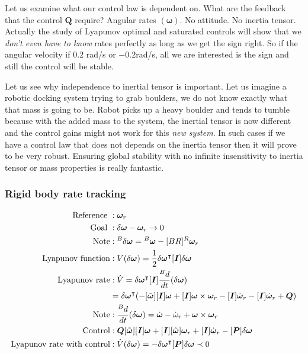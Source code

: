 \documentclass{article}
\begin{document}
Let us examine what our control law is dependent on. What are the feedback that the control $\bm{Q}$ require? Angular rates $(\bm{\omega})$. No attitude. No inertia tensor. Actually the study of Lyapunov optimal and saturated controls will show that we \textit{don't even have to know} rates perfectly as long as we get the sign right. So if the angular velocity if $0.2$ rad/s or $-0.2$rad/s, all we are interested is the sign and still the control will be stable.

Let us see why independence to inertial tensor is important. Let us imagine a robotic docking system trying to grab boulders, we do not know exactly what that mass is going to be. Robot picks up a heavy boulder and tends to tumble because with the added mass to the system, the inertial tensor is now different and the control gains might not work for this \textit{new system}. In such cases if we have a control law that does not depends on the inertia tensor then it will prove to be very robust. Ensuring global stability with no infinite insensitivity to inertia tensor or mass properties is really fantastic.

\subsubsection{Rigid body rate tracking}
\begin{equation*}
  \begin{split}
    \textnormal{Reference }&:\bm{\omega}_{r}\\
    \textnormal{Goal }&:\delta\bm{\omega}-\bm{\omega}_{r}\rightarrow0\\
    \textnormal{Note}&:{}^{B}\delta\bm{\omega}={}^{B}\bm{\omega}-[BR]{}^{R}\bm{\omega}_{r}\\
    \textnormal{Lyapunov function}&:V(\delta\bm{\omega})=\frac{1}{2}\delta\bm{\omega}^{\intercal}[\bm{I}]\delta\bm{\omega}\\
    \textnormal{Lyapunov rate}&:\dot{V}=\delta\bm{\omega}^{\intercal}[\bm{I}]\frac{{}^{B}d}{dt}(\delta\bm{\omega})\\
    &=\delta\bm{\omega}^{\intercal}(-[\tilde{\bm{\omega}}][\bm{I}]\bm{\omega}+[\bm{I}]\bm{\omega}\times\bm{\omega}_{r}-[\bm{I}]\dot{\bm{\omega}}_{r}-[\bm{I}]\dot{\bm{\omega}}_{r}+\bm{Q})\\
    \textnormal{Note}&:\frac{{}^{B}d}{dt}(\delta\bm{\omega})=\dot{\bm{\omega}}-\dot{\omega}_{r}+\bm{\omega}\times\bm{\omega}_{r}\\
    \textnormal{Control}&:\bm{Q}[\tilde{\bm{\omega}}][\bm{I}]\bm{\omega}+[\bm{I}][\tilde{\bm{\omega}}]\bm{\omega}_{r}+[\bm{I}]\dot{\bm{\omega}}_{r}-[\bm{P}]\delta\bm{\omega}\\
    \textnormal{Lyapunov rate with control}&:\dot{V}(\delta\bm{\omega})=-\delta\bm{\omega}^{\intercal}[\bm{P}]\delta\bm{\omega}\prec0\\
  \end{split}
\end{equation*}
\end{document}
